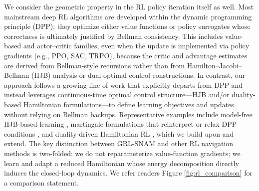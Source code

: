 We consider the geometric property in the RL policy iteration itself as well. Most mainstream deep RL algorithms are developed within the dynamic programming principle (DPP): they optimize either value functions or policy surrogates whose correctness is ultimately justified by Bellman consistency. This includes value-based and actor–critic families, even when the update is implemented via policy gradients (e.g., PPO, SAC, TRPO), because the critic and advantage estimates are derived from Bellman-style recursions rather than from Hamilton–Jacobi–Bellman (HJB) analysis or dual optimal control constructions. In contrast, our approach follows a growing line of work that explicitly departs from DPP and instead leverages continuous-time optimal control structure—HJB and/or duality-based Hamiltonian formulations—to define learning objectives and updates without relying on Bellman backups. Representative examples include model-free HJB-based learning \citep{settai2025temporal}, martingale formulations that reinterpret or relax DPP conditions \citep{jia2023qlearning}, and duality-driven Hamiltonian RL \citep{dpo}, which we build upon and extend. The key distinction between GRL-SNAM and other RL navigation methods is two-folded: we do not reparameterize value-function gradients; we learn and adapt a reduced Hamiltonian whose energy decomposition directly induces the closed-loop dynamics. We refer readers Figure \ref{fig:rl_comparison} for a comparison statement.

